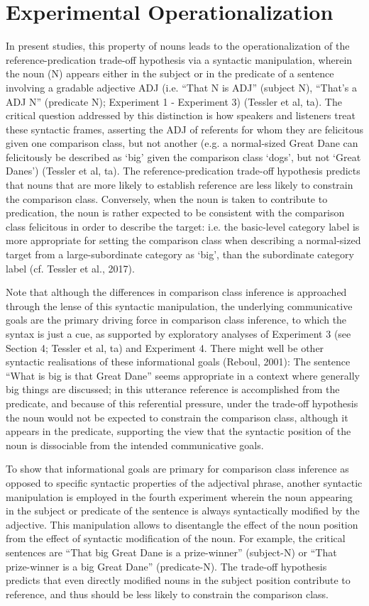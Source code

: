 \section{Experimental Operationalization}
In present studies, this property of nouns leads to the operationalization of the reference-predication trade-off hypothesis via a syntactic manipulation, wherein the noun (N) appears either in the subject or in the predicate of a sentence involving a gradable adjective ADJ (i.e. “That N is ADJ” (subject N), “That’s a ADJ N” (predicate N); Experiment 1 - Experiment 3) (Tessler et al, ta). 
The critical question addressed by this distinction is how speakers and listeners treat these syntactic frames, asserting the ADJ of referents for whom they are felicitous given one comparison class, but not another (e.g. a normal-sized Great Dane can felicitously be described as ‘big’ given the comparison class ‘dogs’, but not ‘Great Danes’) (Tessler et al, ta). The reference-predication trade-off hypothesis predicts that nouns that are more likely to establish reference are less likely to constrain the comparison class. Conversely, when the noun is taken to contribute to predication, the noun is rather expected to be consistent with the comparison class felicitous in order to describe the target: i.e. the basic-level category label is more appropriate for setting the comparison class when describing a normal-sized target from a large-subordinate category as ‘big’, than the subordinate category label (cf. Tessler et al., 2017). 

Note that although the differences in comparison class inference is approached through the lense of this syntactic manipulation, the underlying communicative goals are the primary driving force in comparison class inference, to which the syntax is just a cue, as supported by exploratory analyses of Experiment 3 (see Section 4; Tessler et al, ta) and Experiment 4. 
There might well be other syntactic realisations of these informational goals (Reboul, 2001): The sentence “What is big is that Great Dane” seems appropriate in a context where generally big things are discussed; in this utterance reference is accomplished from the predicate, and because of this referential pressure, under the trade-off hypothesis the noun would not be expected to constrain the comparison class, although it appears in the predicate, supporting the view that the syntactic position of the noun is dissociable from the intended communicative goals.

To show that informational goals are primary for comparison class inference as opposed to specific syntactic properties of the adjectival phrase, another syntactic manipulation is employed in the fourth experiment wherein the noun appearing in the subject or predicate of the sentence is always syntactically modified by the adjective. This manipulation allows to disentangle the effect of the noun position from the effect of syntactic modification of the noun. For example, the critical sentences are “That big Great Dane is a prize-winner” (subject-N) or “That prize-winner is a big Great Dane” (predicate-N). The trade-off hypothesis predicts that even directly modified nouns in the subject position contribute to reference, and thus should be less likely to constrain the comparison class.

